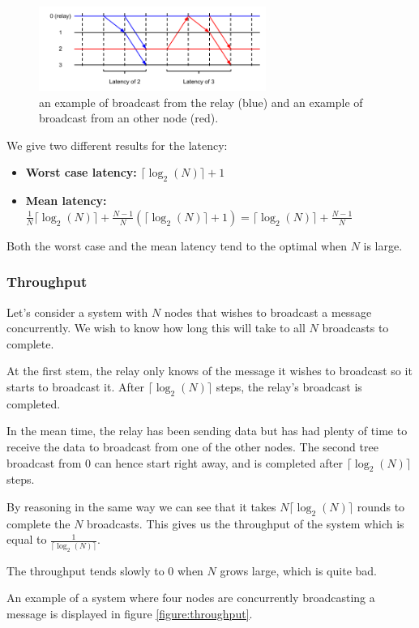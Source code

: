 \documentclass[a4paper]{article}
\begin{document}
\begin{figure}[h]
    \centering
    \includegraphics[width=280px]{Latency.png}
    \caption{an example of broadcast from the relay (blue) and an example of broadcast from an other node (red).}
    \label{figure:latency}
\end{figure}

We give two different results for the latency:
\begin{itemize}
    \item \textbf{Worst case latency:} $\lceil\log_2(N)\rceil + 1$
    \item \textbf{Mean latency:} $\frac{1}{N} \lceil\log_2(N)\rceil +
        \frac{N-1}{N} (\lceil\log_2(N)\rceil + 1)
        = \lceil\log_2(N)\rceil + \frac{N-1}{N}$
\end{itemize}

Both the worst case and the mean latency tend to the optimal when $N$ is
large.

\subsubsection*{Throughput}
Let's consider a system with $N$ nodes that wishes to broadcast a message
concurrently. We wish to know how long this will take to all $N$ broadcasts
to complete.

At the first stem, the relay only knows of the message it wishes to broadcast
so it starts to broadcast it. After $\lceil\log_2(N)\rceil$ steps, the relay's
broadcast is completed.

In the mean time, the relay has been sending data but has had plenty of time
to receive the data to broadcast from one of the other nodes. The second tree
broadcast from $0$ can hence start right away, and is completed after
$\lceil\log_2(N)\rceil$ steps.

By reasoning in the same way we can see that it takes $N \lceil\log_2(N)\rceil$
rounds to complete the $N$ broadcasts. This gives us the throughput of the
system which is equal to $\frac{1}{\lceil\log_2(N)\rceil}$.

The throughput tends slowly to $0$ when $N$ grows large, which is quite bad.

An example of a system where four nodes are concurrently broadcasting a message
is displayed in figure \ref{figure:throughput}.
\end{document}
